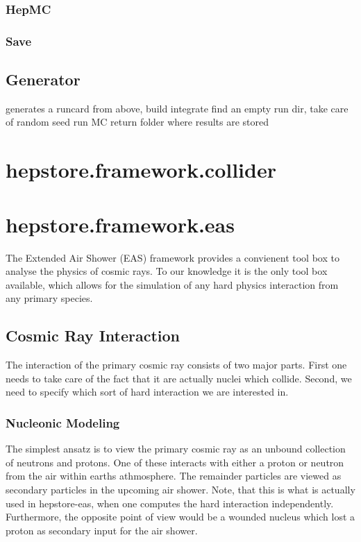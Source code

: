 \subsubsection{HepMC}
\subsubsection{Save}

\subsection{Generator}
generates a runcard from above,
build
integrate
find an empty run dir, take care of random seed
run MC
return folder where results are stored


\section{hepstore.framework.collider}


\section{hepstore.framework.eas}

The Extended Air Shower (EAS) framework provides a convienent tool box
to analyse the physics of cosmic rays. To our knowledge it is the only
tool box available, which allows for the simulation of any hard
physics interaction from any primary species.

\subsection{Cosmic Ray Interaction}
The interaction of the primary cosmic ray consists of two major
parts. First one needs to take care of the fact that it are actually
nuclei which collide. Second, we need to specify which sort of hard
interaction we are interested in.

\subsubsection{Nucleonic Modeling}
The simplest ansatz is to view the primary cosmic ray as an unbound
collection of neutrons and protons. One of these interacts with either
a proton or neutron from the air within earths athmosphere. The
remainder particles are viewed as secondary particles in the upcoming
air shower. Note, that this is what is actually used in hepstore-eas,
when one computes the hard interaction independently. Furthermore, the
opposite point of view would be a wounded nucleus which lost a proton
as secondary input for the air shower.


